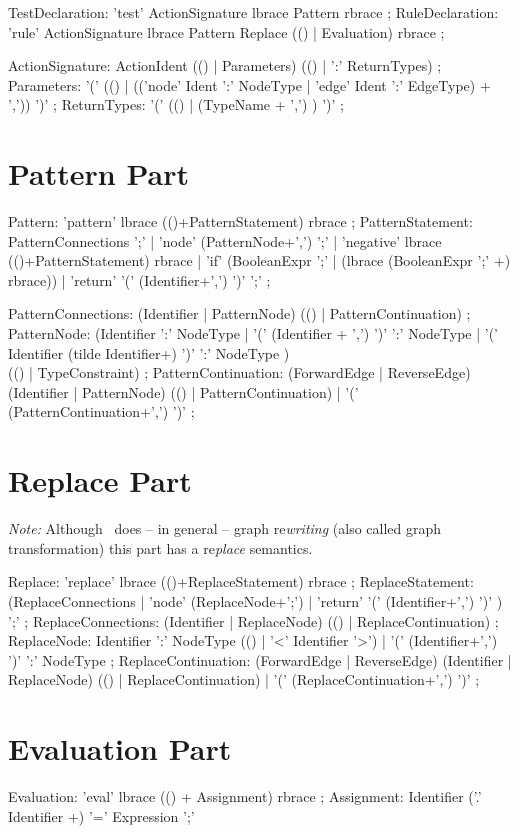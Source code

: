 \begin{rail}
  TestDeclaration: 'test' ActionSignature lbrace Pattern rbrace ;
  RuleDeclaration: 'rule' ActionSignature lbrace Pattern Replace (() | Evaluation) rbrace ;
\end{rail}


\begin{rail}  
  ActionSignature: ActionIdent (() | Parameters) (() | ':' ReturnTypes) ;
  Parameters: '(' (() | (('node' Ident ':' NodeType | 'edge' Ident ':' EdgeType) + ',')) ')' ;
  ReturnTypes: '(' (() | (TypeName + ',') ) ')' ;
\end{rail}


\section{Pattern Part}
\begin{rail}
  Pattern: 'pattern' lbrace (()+PatternStatement) rbrace ;
  PatternStatement: PatternConnections ';' |
    'node' (PatternNode+',') ';' |
    'negative' lbrace (()+PatternStatement) rbrace |
    'if' (BooleanExpr ';' | (lbrace (BooleanExpr ';' +) rbrace)) |
    'return' '(' (Identifier+',') ')' ';' ;
\end{rail} 

\begin{rail}   
  PatternConnections: (Identifier | PatternNode) (() | PatternContinuation) ;
  PatternNode: (Identifier ':' NodeType 
    | '(' (Identifier + ',') ')' ':' NodeType
    | '(' Identifier (tilde Identifier+) ')' ':' NodeType ) \\
      (() | TypeConstraint) ; 
  PatternContinuation: (ForwardEdge | ReverseEdge) (Identifier | PatternNode) (() | PatternContinuation) |
    '(' (PatternContinuation+',') ')' ; 
\end{rail}

\section{Replace Part}
\emph{Note:} Although \GrG\ does -- in general -- graph re\emph{writing} (also called graph transformation) this part has a re\emph{place} semantics.
\begin{rail}
  Replace: 'replace' lbrace (()+ReplaceStatement) rbrace ;
  ReplaceStatement: (ReplaceConnections |
    'node' (ReplaceNode+';') | 
    'return' '(' (Identifier+',') ')' ) ';' ;
  ReplaceConnections: (Identifier | ReplaceNode) (() | ReplaceContinuation) ;
  ReplaceNode: Identifier ':' NodeType (() | '<' Identifier '>') 
    | '(' (Identifier+',') ')' ':' NodeType ;
  ReplaceContinuation:  (ForwardEdge | ReverseEdge) (Identifier | ReplaceNode) (() | ReplaceContinuation) |
    '(' (ReplaceContinuation+',') ')' ;    
\end{rail}

\section{Evaluation Part}
\begin{rail}
  Evaluation: 'eval' lbrace (() + Assignment) rbrace ;
  Assignment: Identifier ('.' Identifier +) '=' Expression ';'
\end{rail} 
